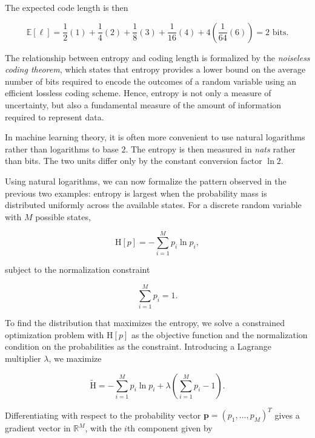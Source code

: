 \documentclass[10pt,twocolumn]{memoir}
\begin{document}
The expected code length is then

\begin{equation}
    \mathbb{E}[\ell] = \frac{1}{2}(1) + \frac{1}{4}(2) + \frac{1}{8}(3) + \frac{1}{16}(4) + 4\left(\frac{1}{64}(6)\right) = 2 \text{ bits}.
\end{equation}

The relationship between entropy and coding length is formalized by the \textit{noiseless coding theorem}, which states that entropy provides a lower bound on the average number of bits required to encode the outcomes of a random variable using an efficient lossless coding scheme. Hence, entropy is not only a measure of uncertainty, but also a fundamental measure of the amount of information required to represent data.

In machine learning theory, it is often more convenient to use natural logarithms rather than logarithms to base $2$. The entropy is then measured in \textit{nats} rather than bits. The two units differ only by the constant conversion factor $\ln 2$.

Using natural logarithms, we can now formalize the pattern observed in the previous two examples: entropy is largest when the probability mass is distributed uniformly across the available states. For a discrete random variable with $M$ possible states,

\begin{equation}
    \mathrm{H}[p] = -\sum_{i=1}^{M}p_i\ln p_i,
\end{equation}

subject to the normalization constraint

\begin{equation}
    \sum_{i=1}^{M} p_i = 1.
\end{equation}

To find the distribution that maximizes the entropy, we solve a constrained optimization problem with $\mathrm{H}[p]$ as the objective function and the normalization condition on the probabilities as the constraint. Introducing a Lagrange multiplier $\lambda$, we maximize

\begin{equation}
    \widetilde{\mathrm{H}} = -\sum_{i=1}^{M}p_i\ln p_i + \lambda \left(\sum_{i=1}^{M}p_i-1\right).
\end{equation}

Differentiating with respect to the probability vector $\mathbf{p} = (p_1,\ldots,p_M)^T$ gives a gradient vector in $\mathbb{R}^M$, with the $i$th component given by
\end{document}
